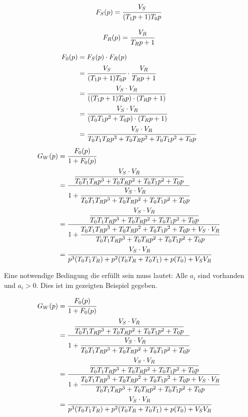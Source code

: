 \begin{minipage}{.45\textwidth}
 \begin{equation} \label{Fstrecke}
  F_S(p) = \cfrac{V_S}{(T_1p+1)T_0p} 
\end{equation}
\end{minipage}
\begin{minipage}{.45\textwidth}
\begin{equation} \label{Fregler}
  F_R(p) = \cfrac{V_R}{T_Rp+1} 
\end{equation}
\end{minipage}

\begin{equation} \label{eq1}
\begin{split}
 F_0(p) &= F_S(p) \cdot F_R(p) \\
 &=  \cfrac{V_S}{(T_1p+1)T_0p} \cdot \cfrac{V_R}{T_Rp+1} \\
 &= \cfrac{V_S\cdot V_R}{((T_1p+1)T_0p) \cdot (T_Rp+1)} \\
 &= \cfrac{V_S\cdot V_R}{(T_0T_1p^2+T_0p) \cdot (T_Rp+1)} \\
 &= \cfrac{V_S\cdot V_R}{T_0T_1T_Rp^3+T_0T_Rp^2+T_0T_1p^2+T_0p} \\
\end{split}
\end{equation}
\begin{equation} \label{eq1}
\begin{split}
 G_W(p) &=  \cfrac{F_0(p)}{1+F_0(p)} \\
 &= \cfrac{\cfrac{V_S\cdot V_R}{T_0T_1T_Rp^3+T_0T_Rp^2+T_0T_1p^2+T_0p}}{1+\cfrac{V_S\cdot V_R}{T_0T_1T_Rp^3+T_0T_Rp^2+T_0T_1p^2+T_0p}} \\
 &= \cfrac{\cfrac{V_S\cdot V_R}{T_0T_1T_Rp^3+T_0T_Rp^2+T_0T_1p^2+T_0p}}{1+\cfrac{T_0T_1T_Rp^3+T_0T_Rp^2+T_0T_1p^2+T_0p+V_S\cdot V_R}{T_0T_1T_Rp^3+T_0T_Rp^2+T_0T_1p^2+T_0p}} \\
 &= \cfrac{V_S\cdot V_R}{p^3(T_0T_1T_R)+p^2(T_0T_R+T_0T_1)+p(T_0)+V_SV_R}
\end{split}
\end{equation}

Eine notwendige Bedingung die erfüllt sein muss lautet: Alle $a_i$ sind vorhanden und $a_i > 0$. Dies ist im gezeigten Beispiel gegeben.


\begin{equation} \label{eg3}
\begin{split}
 G_W(p) &=  \cfrac{F_0(p)}{1+F_0(p)} \\
 &= \cfrac{\cfrac{V_S\cdot V_R}{T_0T_1T_Rp^3+T_0T_Rp^2+T_0T_1p^2+T_0p}}{1+\cfrac{V_S\cdot V_R}{T_0T_1T_Rp^3+T_0T_Rp^2+T_0T_1p^2+T_0p}} \\
 &= \cfrac{\cfrac{V_S\cdot V_R}{T_0T_1T_Rp^3+T_0T_Rp^2+T_0T_1p^2+T_0p}}{1+\cfrac{T_0T_1T_Rp^3+T_0T_Rp^2+T_0T_1p^2+T_0p+V_S\cdot V_R}{T_0T_1T_Rp^3+T_0T_Rp^2+T_0T_1p^2+T_0p}} \\
 &= \cfrac{V_S\cdot V_R}{p^3(T_0T_1T_R)+p^2(T_0T_R+T_0T_1)+p(T_0)+V_SV_R}
\end{split}
\end{equation}

